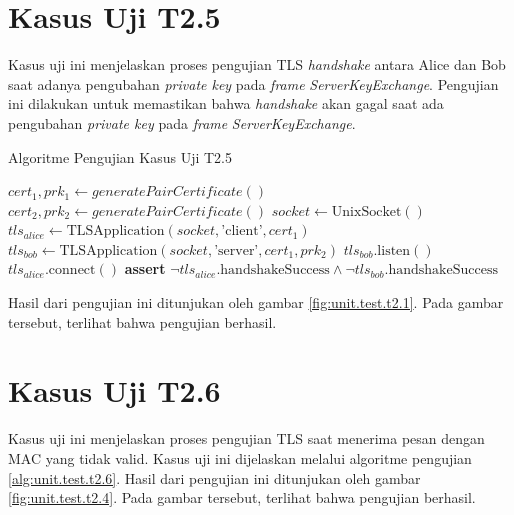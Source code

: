 \section{Kasus Uji T2.5}

Kasus uji ini menjelaskan proses pengujian TLS \emph{handshake} antara Alice dan Bob saat adanya pengubahan \emph{private key} pada \emph{frame} \emph{ServerKeyExchange}. Pengujian ini dilakukan untuk memastikan bahwa \emph{handshake} akan gagal saat ada pengubahan \emph{private key} pada \emph{frame} \emph{ServerKeyExchange}.

\begin{algorithm}
  \caption{Algoritme Pengujian Kasus Uji T2.5}
  \label{alg:unit.test.t2.5}
  \begin{algorithmic}
    \State $cert_1, prk_1 \gets generatePairCertificate()$
    \State $cert_2, prk_2 \gets generatePairCertificate()$
    \State $socket \gets \text{UnixSocket}()$
    \State $tls_{alice} \gets \text{TLSApplication}(socket, \text{'client'}, cert_1)$ 
    \State $tls_{bob} \gets \text{TLSApplication}(socket, \text{'server'}, cert_1, prk_2)$
    \State
    \State $tls_{bob}.\text{listen}()$  
    \State $tls_{alice}.\text{connect}()$  
    \State
    \State
    \State \textbf{assert} $\lnot tls_{alice}.\text{handshakeSuccess} \land \lnot tls_{bob}.\text{handshakeSuccess}$
  \end{algorithmic}
\end{algorithm}

Hasil dari pengujian ini ditunjukan oleh gambar \ref{fig:unit.test.t2.1}. Pada gambar tersebut, terlihat bahwa pengujian berhasil.

\section{Kasus Uji T2.6}

Kasus uji ini menjelaskan proses pengujian TLS saat menerima pesan dengan MAC yang tidak valid. Kasus uji ini dijelaskan melalui algoritme pengujian \ref{alg:unit.test.t2.6}. Hasil dari pengujian ini ditunjukan oleh gambar \ref{fig:unit.test.t2.4}. Pada gambar tersebut, terlihat bahwa pengujian berhasil.


